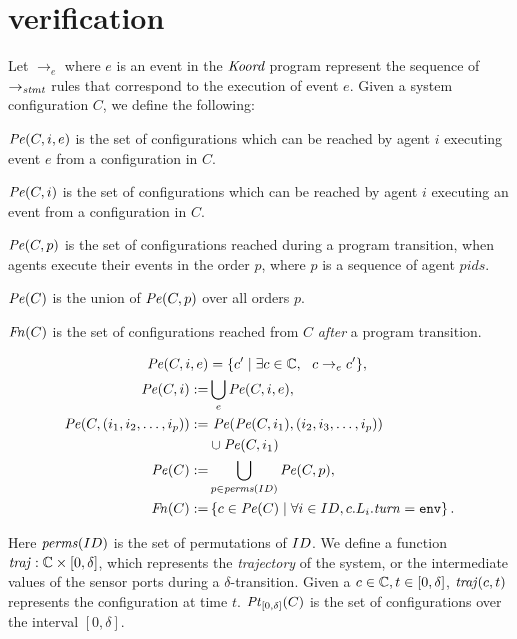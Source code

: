 \section{verification}
\label{sec:verification}

Let $\rightarrow_{e}$ where $e$ is an event in the $\emph{Koord}$ program represent the sequence of $\rightarrow_\mathit{stmt}$ rules that correspond to the execution of event $e$. Given a system configuration $C$, we define the following:
 \begin{inparaenum}[(i)]
     \item $\mathit{Pe}(C,i,e)$ is the set of configurations which can be reached by agent $i$ executing event $e$ from a configuration in $C$.
     \item$\mathit{Pe}(C,i)$ is the set of configurations which can be reached by agent $i$ executing an event from a configuration in $C$.
     \item$\mathit{Pe}(C,p)$ is the set of configurations reached during a program transition, when agents execute their events in the order $p$, where $p$ is a sequence of agent $\mathit{pids}$.
     \item $\mathit{Pe}(C)$ is the union of $\mathit{Pe}(C,p)$ over all orders $p$.
     \item$\mathit{Fn}(C)$ is the set of configurations reached from $C$ \emph{after} a program transition.
 \end{inparaenum}
\vspace{1mm}
\begin{mdframed}
\footnotesize
\begin{align*}
    \Post (C,i,e) &= \{ c^\prime\mid \exists c\in \pwg,  \ \ c\rightarrow_{e} c^\prime \},\\
\Post(C,i) :=& \bigcup_e \Post(C,i,e),\\
\Post(C,(i_1,i_2,\ldots ,i_p)) := & \ \Post(\Post(C,i_1),(i_2,i_3,\ldots,i_p))\\ & \cup \Post(C,i_1)\\
\Post(C) :=& \bigcup_{p\in \mathit{perms}(\UINS)} \Post(C,p), \\
\Final(C) :=& \left\{ c\in \Post(C)\mid \forall i \in \UINS, c.L_i.\turn = \env \right\}.
\end{align*}
\end{mdframed}

Here $\mathit{perms}(ID)$ is the set of permutations of $ID$.
We define a function $\mathit{traj}: \mathbb{C} \times \left[0,\delta\right]$, which represents the \emph{trajectory} of the system, or the intermediate values of the sensor ports during a $\delta$-transition. Given a $c\in \mathbb{C}, t\in \left[0,\delta\right]$, $\mathit{traj}(c,t)$ represents the configuration at time $t$. $\mathit{Pt}_{[0,\delta]}(C)$ is  the set of configurations over the interval $[0,\delta]$.

